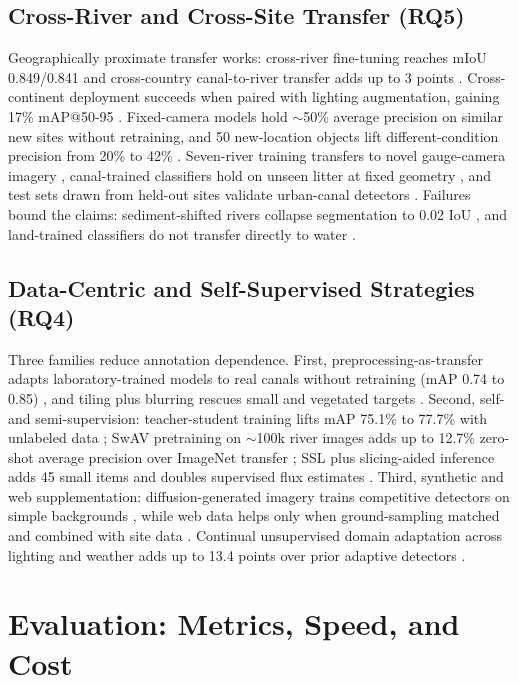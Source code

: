 \documentclass[12pt]{article}
\begin{document}
\subsection{Cross-River and Cross-Site Transfer (RQ5)}
Geographically proximate transfer works: cross-river fine-tuning reaches mIoU 0.849/0.841 \cite{Pati2025} and cross-country canal-to-river transfer adds up to 3 points \cite{Maharjan2022}. Cross-continent deployment succeeds when paired with lighting augmentation, gaining 17\% mAP@50-95 \cite{Saddi2024}. Fixed-camera models hold $\sim$50\% average precision on similar new sites without retraining, and 50 new-location objects lift different-condition precision from 20\% to 42\% \cite{Lieshout2020}. Seven-river training transfers to novel gauge-camera imagery \cite{Kataoka2024}, canal-trained classifiers hold on unseen litter at fixed geometry \cite{JiaFrontiers2023}, and test sets drawn from held-out sites validate urban-canal detectors \cite{Tharani2021}. Failures bound the claims: sediment-shifted rivers collapse segmentation to 0.02 IoU \cite{SoleGomez2022}, and land-trained classifiers do not transfer directly to water \cite{Iordache2022}.

\subsection{Data-Centric and Self-Supervised Strategies (RQ4)}
Three families reduce annotation dependence. First, preprocessing-as-transfer adapts laboratory-trained models to real canals without retraining (mAP 0.74 to 0.85) \cite{Nunkhaw2025}, and tiling plus blurring rescues small and vegetated targets \cite{FrontEnv2025}. Second, self- and semi-supervision: teacher-student training lifts mAP 75.1\% to 77.7\% with unlabeled data \cite{Sun2025}; SwAV pretraining on $\sim$100k river images adds up to 12.7\% zero-shot average precision over ImageNet transfer \cite{JiaSwAV2024}; SSL plus slicing-aided inference adds 45 small items and doubles supervised flux estimates \cite{JiaFlux2025}. Third, synthetic and web supplementation: diffusion-generated imagery trains competitive detectors on simple backgrounds \cite{Pan2023}, while web data helps only when ground-sampling matched and combined with site data \cite{Pan2022}. Continual unsupervised domain adaptation across lighting and weather adds up to 13.4 points over prior adaptive detectors \cite{EAAI2023}.

\section{Evaluation: Metrics, Speed, and Cost}
\label{sec:evaluation}
\end{document}
